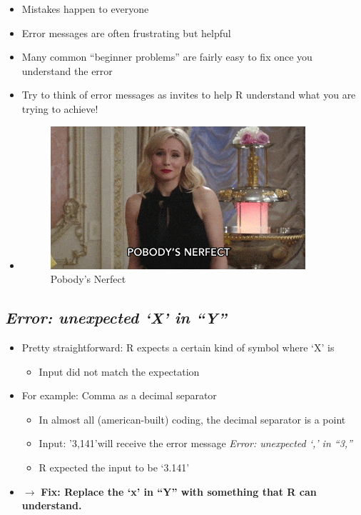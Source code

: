 \documentclass[
]{book}
\providecommand{\tightlist}{%
  \setlength{\itemsep}{0pt}\setlength{\parskip}{0pt}}
\begin{document}
\begin{itemize}
\item
  Mistakes happen to everyone
\item
  Error messages are often frustrating but helpful
\item
  Many common ``beginner problems'' are fairly easy to fix once you understand the error
\item
  Try to think of error messages as invites to help R understand what you are trying to achieve!
\item
  \begin{figure}
  \centering
  \includegraphics[width=\textwidth,height=2.08333in]{./img/nerfect.webp}
  \caption{Pobody's Nerfect}\label{id}
  \end{figure}
\end{itemize}

\subsection{\texorpdfstring{\emph{Error: unexpected `X' in ``Y''}}{Error: unexpected `X' in ``Y''}}\label{error-unexpected-x-in-y}

\begin{itemize}
\tightlist
\item
  Pretty straightforward: R expects a certain kind of symbol where `X' is

  \begin{itemize}
  \tightlist
  \item
    Input did not match the expectation
  \end{itemize}
\item
  For example: Comma as a decimal separator

  \begin{itemize}
  \tightlist
  \item
    In almost all (american-built) coding, the decimal separator is a point
  \item
    Input: '3,141'will receive the error message \emph{Error: unexpected `,' in ``3,''}
  \item
    R expected the input to be `3.141'
  \end{itemize}
\item
  \(\rightarrow\) \textbf{Fix: Replace the `x' in ``Y'' with something that R can understand.}
\end{itemize}
\end{document}
